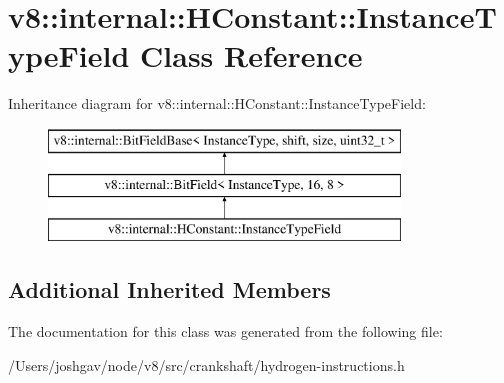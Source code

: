 \hypertarget{classv8_1_1internal_1_1_h_constant_1_1_instance_type_field}{}\section{v8\+:\+:internal\+:\+:H\+Constant\+:\+:Instance\+Type\+Field Class Reference}
\label{classv8_1_1internal_1_1_h_constant_1_1_instance_type_field}
Inheritance diagram for v8\+:\+:internal\+:\+:H\+Constant\+:\+:Instance\+Type\+Field\+:\begin{figure}[H]
\begin{center}
\leavevmode
\includegraphics[height=3.000000cm]{classv8_1_1internal_1_1_h_constant_1_1_instance_type_field}
\end{center}
\end{figure}
\subsection*{Additional Inherited Members}


The documentation for this class was generated from the following file\+:\begin{DoxyCompactItemize}
\item 
/\+Users/joshgav/node/v8/src/crankshaft/hydrogen-\/instructions.\+h\end{DoxyCompactItemize}
